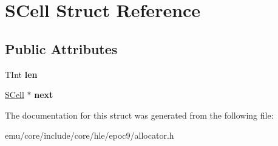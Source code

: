 \hypertarget{struct_s_cell}{}\section{S\+Cell Struct Reference}
\label{struct_s_cell}
\subsection*{Public Attributes}
\begin{DoxyCompactItemize}
\item 
\mbox{\label{struct_s_cell_a1e2efb1a0c2fe04b88a50804e3b0a5af}} 
T\+Int {\bfseries len}
\item 
\mbox{\label{struct_s_cell_af5952f9f909816bb2c649552c8d1f8d4}} 
\mbox{\hyperlink{struct_s_cell}{S\+Cell}} $\ast$ {\bfseries next}
\end{DoxyCompactItemize}


The documentation for this struct was generated from the following file\+:\begin{DoxyCompactItemize}
\item 
emu/core/include/core/hle/epoc9/allocator.\+h\end{DoxyCompactItemize}
